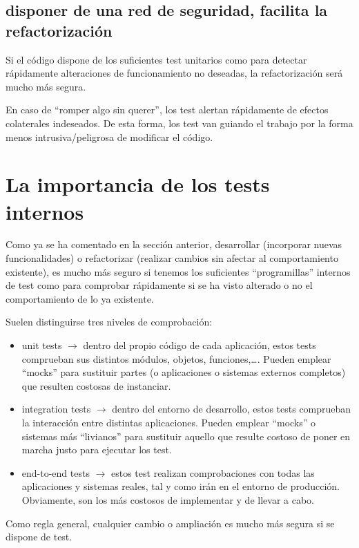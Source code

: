 \documentclass[spanish,12pt,a4paper,final,oneside]{book}
\begin{document}
\subsection{disponer de una red de seguridad, facilita la refactorización}
Si el código dispone de los suficientes test unitarios como para detectar rápidamente alteraciones de funcionamiento no deseadas, la refactorización será mucho más segura. 

En caso de ``romper algo sin querer'', los test alertan rápidamente de efectos colaterales indeseados. De esta forma, los test van guiando el trabajo por la forma menos intrusiva/peligrosa de modificar el código.

\section{La importancia de los tests internos}
Como ya se ha comentado en la sección anterior, desarrollar (incorporar nuevas funcionalidades) o refactorizar (realizar cambios sin afectar al comportamiento existente), es mucho más seguro si tenemos los suficientes ``programillas'' internos de test como para comprobar rápidamente si se ha visto alterado o no el comportamiento de lo ya existente.

Suelen distinguirse tres niveles de comprobación:
\begin{itemize}

\item unit tests $\rightarrow$ dentro del propio código de cada aplicación, estos tests comprueban sus distintos módulos, objetos, funciones,\ldots. Pueden emplear ``mocks'' para sustituir partes (o aplicaciones o sistemas externos completos) que resulten costosas de instanciar.

\item integration tests $\rightarrow$ dentro del entorno de desarrollo, estos tests comprueban la interacción entre distintas aplicaciones. Pueden emplear ``mocks'' o sistemas más ``livianos'' para sustituir aquello que resulte costoso de poner en marcha justo para ejecutar los test.

\item end-to-end tests $\rightarrow$ estos test realizan comprobaciones con todas las aplicaciones y sistemas reales, tal y como irán en el entorno de producción. Obviamente, son los más costosos de implementar y de llevar a cabo.

\end{itemize}

Como regla general, cualquier cambio o ampliación es mucho más segura si se dispone de test.
\end{document}
